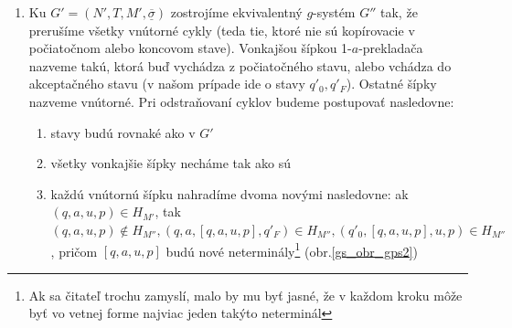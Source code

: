 \begin{dokaz}
\begin{enumerate}
\begin{enumerate}
    Na to, aby sme mali $L(G)=L(G')$ ešte potrebujeme v istom kroku
    odznačiť prvý aj posledný označený symbol. Avšak keďže máme v
    1-$a$-prekladači $g$-systému $G'$ šípky z $q'_0$ do iného stavu,
    resp. šípky do $q'_F$ z iného stavu (teda nie kopírovacie cykly v
    týchto stavoch) iba na označený symbol, tak s odznačenou vetnou
    formou už ďalej nepohneme. Z toho plynie, že symboly možno
    odznačiť len v poslednom kroku odvodenia, teda vtedy, ak všetky
    symboly vetnej formy, okrem prvého a posledného, sú terminály a aj
    prvý a posledný symbol (odhliadnuc od označenia) sú terminály.
    Teda opäť nedeterministicky hádame posledný krok. Formálne
    definujme:
    \[
    H_T=\{(q'_0,\overline{a},a,q_T),(q_T,a,a,q_T),
    (q_T,\underline{a},a,q'_F)\mm a\in T\}
    \]
    $q_T$ je nový stav 1-$a$-prekladača $g$-systému $G'$. Zachovali
    sme konzistentnosť v tom zmysle, že z $q'_0$ vychádzajú, okrem
    kopírovacích cyklov, iba šípky na prvý (nad\-čiar\-knu\-tý) symbol
    a do $q'_F$ vchádzajú, okrem kopírovacích cyklov, iba šípky na
    posledný\linebreak (pod\-čiar\-knu\-tý) symbol vetnej formy, teda máme
    $L(G)=L(G')$, pričom\newline $G'=(N',T,M',\underline{\overline{\sigma}})$.
    Čo sa týka $M'$ pre nás je zaujímavé, ako sa zmenila prechodová
    množina: keď v $M$ to bola $H$, tak v $M'$ to bude
    $H_{M'}=H'\cup\overline{H}\cup\underline{H}\cup H_T$. Pokiaľ ide o
    stavy a abecedy, ich konštrukcia by mala byť z už uvedeného
    zrejmá.
  \end{enumerate}
  \item Ku $G'=(N',T,M',\underline{\overline{\sigma}})$
  zostrojíme ekvivalentný $g$-systém $G''$ tak, že prerušíme všetky vnútorné cykly
  (teda tie, ktoré nie sú kopírovacie v počiatočnom alebo koncovom
  stave). Vonkajšou šípkou 1-$a$-prekladača nazveme takú, ktorá buď
  vychádza z počiatočného stavu, alebo vchádza do akceptačného stavu
  (v našom prípade ide o stavy $q'_0,q'_F$). Ostatné šípky nazveme
  vnútorné. Pri odstraňovaní cyklov budeme postupovať nasledovne:
  \begin{enumerate}
    \item stavy budú rovnaké ako v $G'$
    \item všetky vonkajšie šípky necháme tak ako sú
    \item každú vnútornú šípku nahradíme dvoma novými nasledovne: ak
    $(q,a,u,p)\in H_{M'}$, tak $(q,a,u,p)\not\in H_{M''},
    (q,a,[q,a,u,p],q'_{F})\in H_{M''}, (q'_0,[q,a,u,p],u,p)\in
    H_{M''}$, pričom $[q,a,u,p]$ budú nové neterminály\footnote{Ak sa
    čitateľ trochu zamyslí, malo by mu byť jasné, že v každom kroku
    môže byť vo vetnej forme najviac jeden takýto neterminál}
    (obr.\ref{gs_obr_gps2})
  \end{enumerate}


\end{enumerate}
\end{dokaz}
